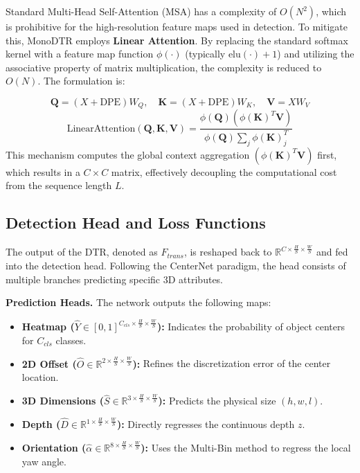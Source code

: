 Standard Multi-Head Self-Attention (MSA) has a complexity of $O(N^2)$, which is prohibitive for the high-resolution feature maps used in detection. To mitigate this, MonoDTR employs \textbf{Linear Attention}. By replacing the standard softmax kernel with a feature map function $\phi(\cdot)$ (typically $\text{elu}(\cdot) + 1$) and utilizing the associative property of matrix multiplication, the complexity is reduced to $O(N)$. The formulation is:

\begin{equation}
    \mathbf{Q} = (X + \text{DPE})W_Q, \quad \mathbf{K} = (X + \text{DPE})W_K, \quad \mathbf{V} = X W_V
\end{equation}
\begin{equation}
    \text{LinearAttention}(\mathbf{Q}, \mathbf{K}, \mathbf{V}) = \frac{\phi(\mathbf{Q}) (\phi(\mathbf{K})^T \mathbf{V})}{\phi(\mathbf{Q}) \sum_{j} \phi(\mathbf{K})_j^T}
\end{equation}
This mechanism computes the global context aggregation $(\phi(\mathbf{K})^T \mathbf{V})$ first, which results in a $C \times C$ matrix, effectively decoupling the computational cost from the sequence length $L$.

\subsection{Detection Head and Loss Functions}
The output of the DTR, denoted as $F_{trans}$, is reshaped back to $\mathbb{R}^{C \times \frac{H}{S} \times \frac{W}{S}}$ and fed into the detection head. Following the CenterNet paradigm, the head consists of multiple branches predicting specific 3D attributes.

\textbf{Prediction Heads.}
The network outputs the following maps:
\begin{itemize}
    \item \textbf{Heatmap ($\hat{Y} \in [0,1]^{C_{cls} \times \frac{H}{S} \times \frac{W}{S}}$):} Indicates the probability of object centers for $C_{cls}$ classes.
    \item \textbf{2D Offset ($\hat{O} \in \mathbb{R}^{2 \times \frac{H}{S} \times \frac{W}{S}}$):} Refines the discretization error of the center location.
    \item \textbf{3D Dimensions ($\hat{S} \in \mathbb{R}^{3 \times \frac{H}{S} \times \frac{W}{S}}$):} Predicts the physical size $(h, w, l)$.
    \item \textbf{Depth ($\hat{D} \in \mathbb{R}^{1 \times \frac{H}{S} \times \frac{W}{S}}$):} Directly regresses the continuous depth $z$.
    \item \textbf{Orientation ($\hat{\alpha} \in \mathbb{R}^{8 \times \frac{H}{S} \times \frac{W}{S}}$):} Uses the Multi-Bin method to regress the local yaw angle.
\end{itemize}

